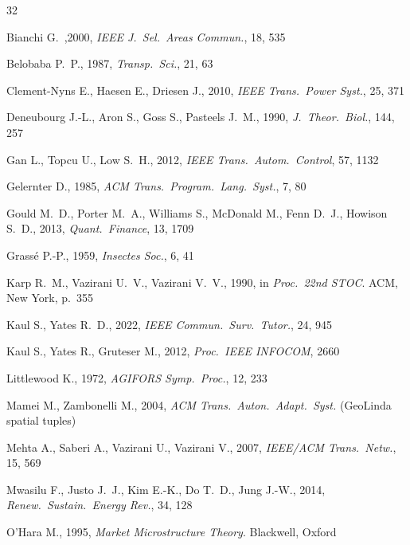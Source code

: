 \documentclass[twoside,twocolumn,usenatbib]{mnras}
\begin{document}
\begin{thebibliography}{32}

 Bianchi G.~,2000, \emph{IEEE
J.~Sel.~Areas Commun.}, 18, 535

 Belobaba P.~P., 1987,
\emph{Transp.~Sci.}, 21, 63

 Clement-Nyns E.,
Haesen E., Driesen J., 2010, \emph{IEEE Trans.~Power Syst.}, 25, 371

 Deneubourg J.-L.,
Aron S., Goss S., Pasteels J.~M., 1990, \emph{J.~Theor.~Biol.}, 144, 257

 Gan L., Topcu U., Low S.~H., 2012,
\emph{IEEE Trans.~Autom.~Control}, 57, 1132

 Gelernter D., 1985,
\emph{ACM Trans.~Program.~Lang.~Syst.}, 7, 80

 Gould M.~D., Porter M.~A.,
Williams S., McDonald M., Fenn D.~J., Howison S.~D., 2013,
\emph{Quant.~Finance}, 13, 1709

 Grass\'e P.-P., 1959,
\emph{Insectes Soc.}, 6, 41

 Karp R.~M., Vazirani U.~V.,
Vazirani V.~V., 1990, in \emph{Proc.~22nd STOC}. ACM, New York, p.~355

 Kaul S., Yates R.~D., 2022,
\emph{IEEE Commun.~Surv.~Tutor.}, 24, 945

 Kaul S., Yates R., Gruteser M.,
2012, \emph{Proc.~IEEE INFOCOM}, 2660

 Littlewood K., 1972,
\emph{AGIFORS Symp.~Proc.}, 12, 233

 Mamei M.,
Zambonelli M., 2004, \emph{ACM Trans.~Auton.~Adapt.~Syst.} (GeoLinda
spatial tuples)

 Mehta A., Saberi A.,
Vazirani U., Vazirani V., 2007, \emph{IEEE/ACM Trans.~Netw.}, 15, 569

 Mwasilu F., Justo J.~J.,
Kim E.-K., Do T.~D., Jung J.-W., 2014, \emph{Renew.~Sustain.~Energy
Rev.}, 34, 128

 O'Hara M., 1995, \emph{Market
Microstructure Theory}. Blackwell, Oxford


\end{thebibliography}
\end{document}
